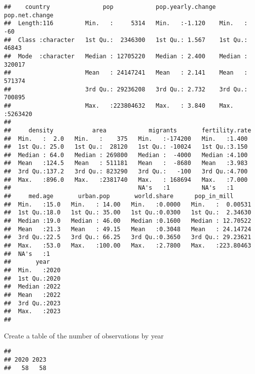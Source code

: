 \documentclass[
]{article}
\newenvironment{Shaded}{\begin{snugshade}}{\end{snugshade}}
\newcommand{\FunctionTok}[1]{\textcolor[rgb]{0.13,0.29,0.53}{\textbf{#1}}}
\newcommand{\NormalTok}[1]{#1}
\newcommand{\SpecialCharTok}[1]{\textcolor[rgb]{0.81,0.36,0.00}{\textbf{#1}}}
\begin{document}
\begin{verbatim}
##    country               pop            pop.yearly.change pop.net.change   
##  Length:116         Min.   :     5314   Min.   :-1.120    Min.   :    -60  
##  Class :character   1st Qu.:  2346300   1st Qu.: 1.567    1st Qu.:  46843  
##  Mode  :character   Median : 12705220   Median : 2.400    Median : 320017  
##                     Mean   : 24147241   Mean   : 2.141    Mean   : 571374  
##                     3rd Qu.: 29236208   3rd Qu.: 2.732    3rd Qu.: 700895  
##                     Max.   :223804632   Max.   : 3.840    Max.   :5263420  
##                                                                            
##     density           area            migrants       fertility.rate 
##  Min.   :  2.0   Min.   :    375   Min.   :-174200   Min.   :1.400  
##  1st Qu.: 25.0   1st Qu.:  28120   1st Qu.: -10024   1st Qu.:3.150  
##  Median : 64.0   Median : 269800   Median :  -4000   Median :4.100  
##  Mean   :124.5   Mean   : 511181   Mean   :  -8680   Mean   :3.983  
##  3rd Qu.:137.2   3rd Qu.: 823290   3rd Qu.:   -100   3rd Qu.:4.700  
##  Max.   :896.0   Max.   :2381740   Max.   : 168694   Max.   :7.000  
##                                    NA's   :1         NA's   :1      
##     med.age       urban.pop       world.share      pop_in_mill       
##  Min.   :15.0   Min.   : 14.00   Min.   :0.0000   Min.   :  0.00531  
##  1st Qu.:18.0   1st Qu.: 35.00   1st Qu.:0.0300   1st Qu.:  2.34630  
##  Median :19.0   Median : 46.00   Median :0.1600   Median : 12.70522  
##  Mean   :21.3   Mean   : 49.15   Mean   :0.3048   Mean   : 24.14724  
##  3rd Qu.:22.5   3rd Qu.: 66.25   3rd Qu.:0.3650   3rd Qu.: 29.23621  
##  Max.   :53.0   Max.   :100.00   Max.   :2.7800   Max.   :223.80463  
##  NA's   :1                                                           
##       year     
##  Min.   :2020  
##  1st Qu.:2020  
##  Median :2022  
##  Mean   :2022  
##  3rd Qu.:2023  
##  Max.   :2023  
## 
\end{verbatim}

Create a table of the number of observations by year

\begin{Shaded}
\end{Shaded}

\begin{verbatim}
## 
## 2020 2023 
##   58   58
\end{verbatim}
\end{document}
